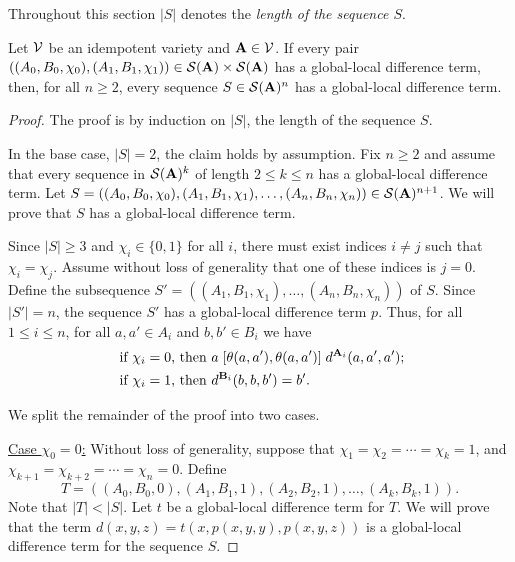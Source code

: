 Throughout this section $|S|$ denotes the \emph{length of the
sequence $S$}.

\begin{thm}
  \label{thm:glob-loc-diff-terms}
  Let $\mathcal{V}$ be an idempotent variety and
  $\mathbf{A} \in \mathcal{V}$. 
  If every pair
  $((A_0, B_0, \chi_0), (A_1, B_1, \chi_1)) \in \mathcal{S}(\mathbf{A}) \times \mathcal{S}(\mathbf{A})$
  has a global-local difference term,
  then, for all $n\geq 2$, every sequence $S \in \mathcal{S}(\mathbf{A})^n$
  has a global-local difference term.
\end{thm}
\begin{proof}
The proof is by induction on $|S|$, the length of the sequence
$S$.

In the base case, $|S| = 2$, the claim holds by assumption.
Fix $n\geq 2$ and assume that every sequence in $\mathcal{S}(\mathbf{A})^k$ of length $2\leq k \leq n$ has
a global-local difference term. Let
$S = ((A_0, B_0, \chi_0), (A_1, B_1, \chi_1), \dots, (A_{n}, B_{n},\chi_{n})) \in \mathcal{S}(\mathbf{A})^{n+1}$.
We will prove that $S$ has a global-local difference term.

Since $|S| \geq 3$ and $\chi_i \in \{0,1\}$ for all $i$, there must exist
indices $i\neq j$ such that $\chi_i = \chi_j$. Assume without loss of generality
that one of these indices is $j=0$.  Define the subsequence
$S' = ((A_1, B_1, \chi_1), \dots,(A_{n}, B_{n},\chi_{n}))$ of $S$. %
Since $|S'| = n$, the sequence $S'$ has a global-local difference term $p$.
Thus, for all $1\leq i \leq n$,
for all $a, a'\in A_i$ and $b, b' \in B_i$ we have
\begin{align*}
  \text{ if $\chi_i=0$, then } &
  a \mathrel{[\theta(a,a'), \theta(a,a')]} d^{\mathbf{A}_i}(a,a',a');\\
  \text{ if $\chi_i=1$, then } &
  d^{\mathbf{B}_i}(b,b,b') = b'.
\end{align*}

We split the remainder of the proof into two cases.%

\vskip3mm

\noindent \underline{Case $\chi_0 = 0$:}
Without loss of generality, suppose that
$\chi_1 = \chi_2 = \cdots =\chi_k = 1$,
and
$\chi_{k+1} = \chi_{k+2} = \cdots = \chi_{n} = 0$.
Define
\[
T = ((A_0, B_0, 0), (A_1, B_1, 1), (A_2, B_2, 1), \dots, (A_k, B_k, 1)).
\]
Note that $|T| < |S|$.
Let $t$ be a global-local difference term for $T$.
We will prove that the term $d(x,y,z) = t(x, p(x,y,y), p(x,y,z))$
is a global-local difference term for the sequence $S$.


\end{proof}
